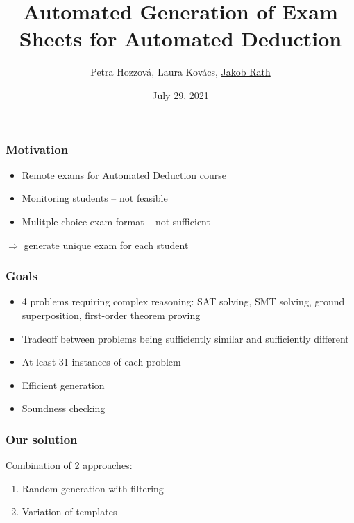 \documentclass[xcolor={table}]{beamer}
\title{Automated Generation of Exam Sheets for Automated Deduction} %
\author{Petra Hozzov\'a, Laura Kov\'acs, \underline{Jakob Rath}} %
\institute{
Vienna University of Technology%
}
\date{\vspace*{-3em}\small July 29, 2021} %
\begin{document}
\begin{frame}[plain]
\titlepage %
\end{frame}
\addtocounter{framenumber}{-1}



\begin{frame}
\frametitle{Motivation}
\begin{itemize}
\item Remote exams for Automated Deduction course
\item Monitoring students -- not feasible
\item Mulitple-choice exam format -- not sufficient
\end{itemize}
\pause
  \vspace*{1em}
\qquad $\Rightarrow$ generate unique exam for each student
\end{frame}



\begin{frame}
\frametitle{Goals}
\begin{itemize}
\item 4 problems requiring complex reasoning:
  SAT solving, SMT solving, ground superposition, first-order theorem proving
\item Tradeoff between problems being sufficiently similar and sufficiently different
\item At least 31 instances of each problem
\item Efficient generation
\item Soundness checking
\end{itemize}
\end{frame}



\begin{frame}
\frametitle{Our solution}
Combination of 2 approaches:
\begin{enumerate}
\item Random generation with filtering
\item Variation of templates
\end{enumerate}
\end{frame}
\end{document}
